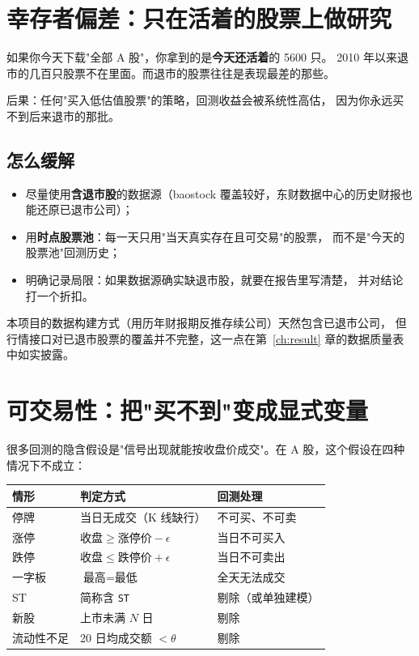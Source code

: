 \section{幸存者偏差：只在活着的股票上做研究}

如果你今天下载"全部 A 股"，你拿到的是\textbf{今天还活着}的 5600 只。
2010 年以来退市的几百只股票不在里面。而退市的股票往往是表现最差的那些。

后果：任何"买入低估值股票"的策略，回测收益会被系统性高估，
因为你永远买不到后来退市的那批。

\subsection{怎么缓解}

\begin{itemize}
  \item 尽量使用\textbf{含退市股}的数据源（baostock 覆盖较好，东财数据中心的历史财报也能还原已退市公司）；
  \item 用\textbf{时点股票池}：每一天只用"当天真实存在且可交易"的股票，
        而不是"今天的股票池"回测历史；
  \item 明确记录局限：如果数据源确实缺退市股，就要在报告里写清楚，
        并对结论打一个折扣。
\end{itemize}

本项目的数据构建方式（用历年财报期反推存续公司）天然包含已退市公司，
但行情接口对已退市股票的覆盖并不完整，这一点在第~\ref{ch:result} 章的数据质量表中如实披露。

\section{可交易性：把"买不到"变成显式变量}

很多回测的隐含假设是"信号出现就能按收盘价成交"。在 A 股，这个假设在四种情况下不成立：

\begin{center}
\begin{tabular}{@{}lll@{}}
\toprule
\textbf{情形} & \textbf{判定方式} & \textbf{回测处理} \\
\midrule
停牌 & 当日无成交（K 线缺行） & 不可买、不可卖 \\
涨停 & $\text{收盘} \ge \text{涨停价} - \epsilon$ & 当日不可买入 \\
跌停 & $\text{收盘} \le \text{跌停价} + \epsilon$ & 当日不可卖出 \\
一字板 & $\text{最高} = \text{最低}$ & 全天无法成交 \\
ST & 简称含 \texttt{ST} & 剔除（或单独建模） \\
新股 & 上市未满 $N$ 日 & 剔除 \\
流动性不足 & 20 日均成交额 $< \theta$ & 剔除 \\
\bottomrule
\end{tabular}
\end{center}


